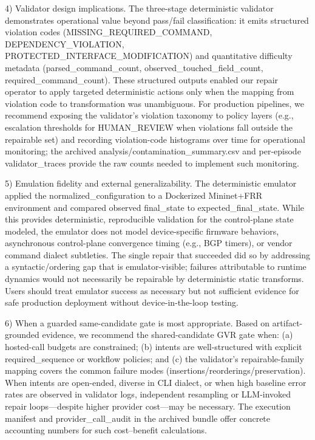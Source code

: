 \documentclass[conference]{IEEEtran}
\begin{document}
4) Validator design implications. The three-stage deterministic validator demonstrates operational value beyond pass/fail classification: it emits structured violation codes (MISSING\_REQUIRED\_COMMAND, DEPENDENCY\_VIOLATION, PROTECTED\_INTERFACE\_MODIFICATION) and quantitative difficulty metadata (parsed\_command\_count, observed\_touched\_field\_count, required\_command\_count). These structured outputs enabled our repair operator to apply targeted deterministic actions only when the mapping from violation code to transformation was unambiguous. For production pipelines, we recommend exposing the validator's violation taxonomy to policy layers (e.g., escalation thresholds for HUMAN\_REVIEW when violations fall outside the repairable set) and recording violation-code histograms over time for operational monitoring; the archived analysis/contamination\_summary.csv and per-episode validator\_traces provide the raw counts needed to implement such monitoring.

5) Emulation fidelity and external generalizability. The deterministic emulator applied the normalized\_configuration to a Dockerized Mininet+FRR environment and compared observed final\_state to expected\_final\_state. While this provides deterministic, reproducible validation for the control-plane state modeled, the emulator does not model device-specific firmware behaviors, asynchronous control-plane convergence timing (e.g., BGP timers), or vendor command dialect subtleties. The single repair that succeeded did so by addressing a syntactic/ordering gap that is emulator-visible; failures attributable to runtime dynamics would not necessarily be repairable by deterministic static transforms. Users should treat emulator success as necessary but not sufficient evidence for safe production deployment without device-in-the-loop testing.

6) When a guarded same-candidate gate is most appropriate. Based on artifact-grounded evidence, we recommend the shared-candidate GVR gate when: (a) hosted-call budgets are constrained; (b) intents are well-structured with explicit required\_sequence or workflow policies; and (c) the validator's repairable-family mapping covers the common failure modes (insertions/reorderings/preservation). When intents are open-ended, diverse in CLI dialect, or when high baseline error rates are observed in validator logs, independent resampling or LLM-invoked repair loops---despite higher provider cost---may be necessary. The execution manifest and provider\_call\_audit in the archived bundle offer concrete accounting numbers for such cost--benefit calculations.
\end{document}
